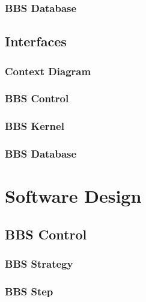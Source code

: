 \documentclass[10pt]{lofar}
\begin{document}
\subsubsection{BBS Database}
\label{subsubsec:sys-database}

\subsection{Interfaces}
\label{subsec:sys-interfaces}

\subsubsection{Context Diagram}
\label{subsubsec:context}

\subsubsection{BBS Control}
\label{subsubsec:interf-control}

\subsubsection{BBS Kernel}
\label{subsubsec:interf-kernel}

\subsubsection{BBS Database}
\label{subsubsec:interf-database}

\pagebreak

\section{Software Design}
\label{sec:software-design}

\subsection{BBS Control}
\label{subsec:design-control}

\subsubsection{BBS Strategy}
\label{subsubsec:design-strategy}

\subsubsection{BBS Step}
\label{subsubsec:design-step}
\end{document}
